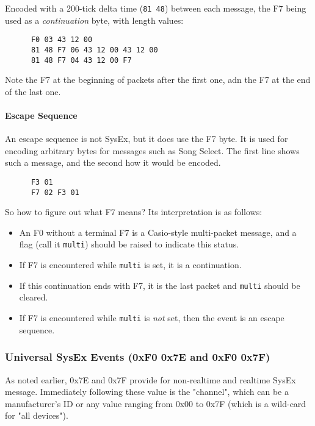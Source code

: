    Encoded with a 200-tick delta time (\texttt{81 48}) between each message,
   the F7 being used as a \textsl{continuation} byte, with length values:

   \begin{verbatim}
      F0 03 43 12 00
      81 48 F7 06 43 12 00 43 12 00
      81 48 F7 04 43 12 00 F7
   \end{verbatim}

   Note the F7 at the beginning of packets after the first one, adn
   the F7 at the end of the last one.

\paragraph{Escape Sequence}
\label{paragraph:patterns_escape_sequence}

   An escape sequence is not SysEx, but it does use the F7 byte.
   It is used for encoding arbitrary bytes for messages such as Song Select.
   The first line shows such a message, and the second how it would be encoded.

   \begin{verbatim}
      F3 01
      F7 02 F3 01
   \end{verbatim}

   So how to figure out what F7 means?
   Its interpretation is as follows:

   \begin{itemize}
      \item An F0 without a terminal F7 is a Casio-style multi-packet message,
         and a flag (call it \texttt{multi})
         should be raised to indicate this status.
      \item If F7 is encountered while \texttt{multi} is set,
         it is a continuation.
      \item If this continuation ends with F7, it is the last packet and
         \texttt{multi} should be cleared.
      \item If F7 is encountered while \texttt{multi} is \textsl{not} set,
         then the event is an escape sequence.
   \end{itemize}

\subsubsection{Universal SysEx Events (0xF0 0x7E and 0xF0 0x7F)}
\label{subsubsec:midi_format_meta_universalsysex_event}

   As noted earlier, 0x7E and 0x7F provide for non-realtime and realtime SysEx
   message.
   Immediately following these value is the "channel", which can be a
   manufacturer's ID or any value ranging from 0x00 to 0x7F (which is a
   wild-card for "all devices").

